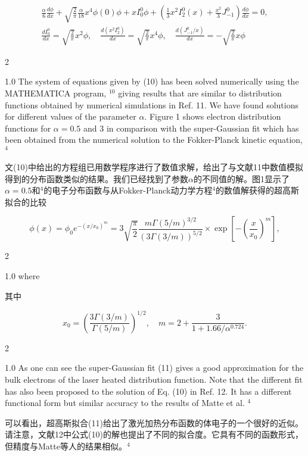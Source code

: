 \documentclass[oneside,onecolumn]{article}
\newcommand\enzhbox[2]{
	\quad\par \begin{paracol}{2} 
			\begin{spacing}{1.0}
					\footnotesize  #1
			\end{spacing}
			
		\switchcolumn[1] 
		#2
	\end{paracol} 
}
\begin{document}
\begin{sloppypar}
  \begin{equation}
  	\begin{gathered}
  		\frac{\alpha}{6} \frac{d \phi}{d x}+\sqrt{\frac{2}{\pi}} \frac{\alpha}{18} x^{4} \phi(0) \phi+x I_{0}^{0} \phi
  +\left(\frac{1}{3} x^{2} I_{2}^{0}(x)+\frac{x^{2}}{3} J_{-1}^{0}\right) \frac{d \phi}{d x}=0, \\
  \frac{d I_{0}^{0}}{d x}=\sqrt{\frac{2}{\pi}} x^{2} \phi, \quad
  \frac{d\left(x^{2} I_{2}^{0}\right)}{d x}=\sqrt{\frac{2}{\pi}} x^{4} \phi,\quad
  \frac{d\left(J_{-1}^{0} / x\right)}{d x}=-\sqrt{\frac{2}{\pi}} x \phi
  	\end{gathered}
  \end{equation}


\enzhbox{  The system of equations given by (10) has been solved numerically using the MATHEMATICA program, ${ }^{10}$ giving results that are similar to distribution functions obtained by numerical simulations in Ref. 11. We have found solutions for different values of the parameter $\alpha$. Figure 1 shows electron distribution functions for $\alpha=0.5$ and 3 in comparison with the super-Gaussian fit which has been obtained from the numerical solution to the Fokker-Planck kinetic equation, ${ }^{4}$
}{
文(10)中给出的方程组已用数学程序进行了数值求解，给出了与文献11中数值模拟得到的分布函数类似的结果。我们已经找到了参数$\alpha$的不同值的解。图1显示了$\alpha=0.5$和${ }^{4}$的电子分布函数与从Fokker-Planck动力学方程${ }^{4}$的数值解获得的超高斯拟合的比较
}
  
  \begin{dmath}
  \phi(x)=\phi_{0} e^{-\left(x / x_{0}\right)^{m}}=  3 \sqrt{\frac{\pi}{2}} \frac{m \Gamma(5 / m)^{3 / 2}}{(3 \Gamma(3 / m))^{5 / 2}}\times \exp \left[-\left(\frac{x}{x_{0}}\right)^{m}\right],
  \end{dmath}

  

\enzhbox{  where
}{
其中
}
  
  \begin{equation*}
  x_{0}=\left(\frac{3 \Gamma(3 / m)}{\Gamma(5 / m)}\right)^{1 / 2}, \quad m=2+\frac{3}{1+1.66 / \alpha^{0.724}} .
  \end{equation*}
  

\enzhbox{  As one can see the super-Gaussian fit (11) gives a good approximation for the bulk electrons of the laser heated distribution function. Note that the different fit has also been proposed to the solution of Eq. (10) in Ref. 12. It has a different functional form but similar accuracy to the results of Matte et al. ${ }^{4}$
}{
可以看出，超高斯拟合(11)给出了激光加热分布函数的体电子的一个很好的近似。请注意，文献12中公式(10)的解也提出了不同的拟合度。它具有不同的函数形式，但精度与Matte等人的结果相似。${ }^{4}$
}
  


\end{sloppypar}
\end{document}
